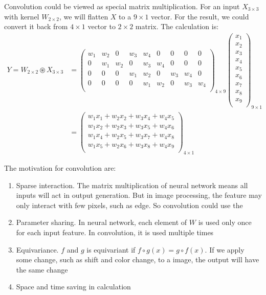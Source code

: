 Convolution could be viewed as special matrix multiplication. For an input $X_{3 \times 3}$ with kernel $W_{2 \times 2}$, we will flatten $X$ to a $9 \times 1$ vector. For the result, we could convert it back from $4 \times 1$ vector to $2 \times 2$ matrix. The calculation is:
\begin{equation}
    \begin{aligned}
        Y = W_{2 \times 2} \circledast X_{3 \times 3} &= \begin{pmatrix}
            w_1 & w_2 & 0 & w_3 & w_4 & 0 & 0 & 0 & 0 \\
            0 & w_1 & w_2 & 0 & w_3 & w_4 & 0 & 0 & 0 \\
            0 & 0 & 0 & w_1 & w_2 & 0 & w_3 & w_4 & 0 \\
            0 & 0 & 0 & 0 & w_1 & w_2 & 0 & w_3 & w_4 \\
        \end{pmatrix}_{4 \times 9} \begin{pmatrix}
            x_1 \\
            x_2 \\
            x_3 \\
            x_4 \\
            x_5 \\
            x_6 \\
            x_7 \\
            x_8 \\
            x_9 \\
        \end{pmatrix}_{9 \times 1} \\
        &= \begin{pmatrix}
            w_1 x_1 + w_2 x_2 + w_3 x_4 + w_4 x_5 \\
            w_1 x_2 + w_2 x_3 + w_3 x_5 + w_4 x_6 \\
            w_1 x_4 + w_2 x_5 + w_3 x_7 + w_4 x_8 \\
            w_1 x_5 + w_2 x_6 + w_3 x_8 + w_4 x_9 \\            
        \end{pmatrix}_{4 \times 1}
    \end{aligned}
\end{equation}

The motivation for convolution are:
\begin{enumerate}
    \item Sparse interaction. The matrix multiplication of neural network means all inputs will act in output generation. But in image processing, the feature may only interact with few pixels, such as edge. So convolution could use the 
    \item Parameter sharing. In neural network, each element of $W$ is used only once for each input feature. In convolution, it is used multiple times
    \item Equivariance. $f$ and $g$ is equivariant if $f \circ g(x) = g \circ f(x)$. If we apply some change, such as shift and color change, to a image, the output will have the same change
    \item Space and time saving in calculation
\end{enumerate}

